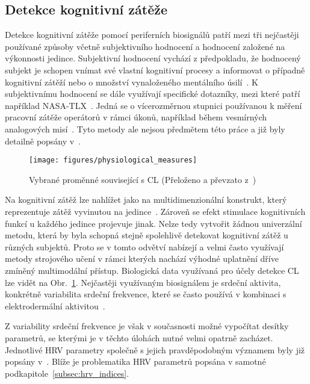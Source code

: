 \subsection{Detekce kognitivní zátěže}
\label{subsec:detekce_CL}
Detekce kognitivní zátěže pomocí periferních biosignálů patří mezi tři
nejčastěji používané způsoby včetně subjektivního hodnocení a hodnocení založené
na výkonnosti jedince. Subjektivní hodnocení vychází z předpokladu, že hodnocený
subjekt je schopen vnímat své vlastní kognitivní procesy a informovat o případně
kognitivní zátěží nebo o množství vynaloženého mentálního
úsilí~\cite{Wang2019,Schnotz2007}. K subjektivnímu hodnocení se dále využívají
specifické dotazníky, mezi které patří například NASA-TLX~\cite{Schnotz2007}.
Jedná se o vícerozměrnou stupnici používanou k měření pracovní zátěže operátorů
v rámci úkonů, například během vesmírných analogových misí~\cite{Sandra2006}.
Tyto metody ale nejsou předmětem této práce a již byly detailně popsány
v~\cite{Schnotz2007}.

\begin{figure}[!htb]
    \begin{center}
        \texttt{[image: figures/physiological\_measures]}
        \caption{Vybrané proměnné související s \gls{CL} (Přeloženo a převzato
            z~\cite{Giannakakis2022})}
        \label{fig:physiological_measures}
    \end{center}
\end{figure}

Na kognitivní zátěž lze nahlížet jako na multidimenzionální konstrukt, který
reprezentuje zátěž vyvinutou na jedince~\cite{Wang2019}. Zároveň se efekt
stimulace kognitivních funkcí u každého jedince projevuje jinak. Nelze tedy
vytvořit žádnou univerzální metodu, která by byla schopná stejně spolehlivě
detekovat kognitivní zátěž u různých subjektů. Proto se v tomto odvětví nabízejí
a velmi často využívají metody strojového učení v rámci kterých nachází výhodné
uplatnění dříve zmíněný multimodální přístup. Biologická data využívaná pro
účely detekce \gls{CL} lze vidět na Obr.~\ref{fig:physiological_measures}.
Nejčastěji využívaným biosignálem je srdeční aktivita, konkrétně variabilita
srdeční frekvence, které se často používá v kombinaci s
elektrodermální aktivitou~\cite{Wang2019}.

Z variability srdeční frekvence je však v současnosti možné vypočítat desítky
parametrů, se kterými je v těchto úlohách nutné velmi opatrně zacházet.
Jednotlivé \gls{HRV} parametry společně s jejich pravděpodobným významem byly
již popsány v~\cite{Haapalainen2010,Rohila2020,Pham2021,Bouny2021}. Blíže je
problematika \gls{HRV} parametrů popsána v samotné
podkapitole~\ref{subsec:hrv_indices}.

